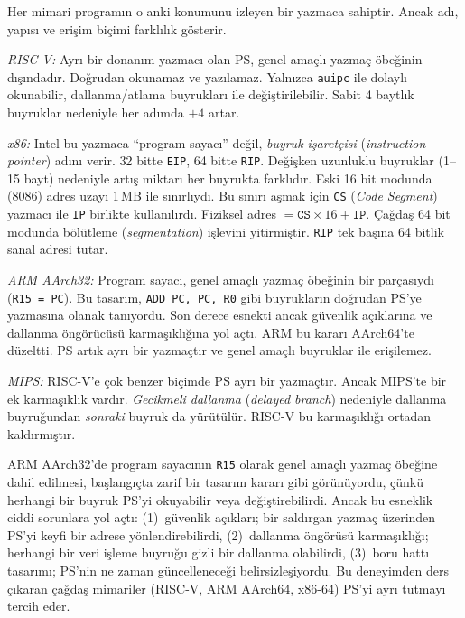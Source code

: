 \begin{karsilastirma}
Her mimari programın o anki konumunu izleyen bir yazmaca sahiptir. Ancak adı, yapısı ve erişim biçimi farklılık gösterir.

\emph{RISC-V:} Ayrı bir donanım yazmacı olan PS, genel amaçlı yazmaç öbeğinin dışındadır. Doğrudan okunamaz ve yazılamaz. Yalnızca \texttt{auipc} ile dolaylı okunabilir, dallanma/atlama buyrukları ile değiştirilebilir. Sabit 4 baytlık buyruklar nedeniyle her adımda $+4$ artar.

\emph{x86:} Intel bu yazmaca ``program sayacı'' değil, \emph{buyruk işaretçisi} (\emph{instruction pointer}) adını verir. 32 bitte \texttt{EIP}, 64 bitte \texttt{RIP}. Değişken uzunluklu buyruklar (1--15 bayt) nedeniyle artış miktarı her buyrukta farklıdır. Eski 16 bit modunda (8086) adres uzayı 1\,MB ile sınırlıydı. Bu sınırı aşmak için \texttt{CS} (\emph{Code Segment}) yazmacı ile \texttt{IP} birlikte kullanılırdı. Fiziksel adres $= \texttt{CS} \times 16 + \texttt{IP}$. Çağdaş 64 bit modunda bölütleme (\emph{segmentation}) işlevini yitirmiştir. \texttt{RIP} tek başına 64 bitlik sanal adresi tutar.

\emph{ARM AArch32:} Program sayacı, genel amaçlı yazmaç öbeğinin bir parçasıydı (\texttt{R15 = PC}). Bu tasarım, \texttt{ADD PC, PC, R0} gibi buyrukların doğrudan PS'ye yazmasına olanak tanıyordu. Son derece esnekti ancak güvenlik açıklarına ve dallanma öngörücüsü karmaşıklığına yol açtı. ARM bu kararı AArch64'te düzeltti. PS artık ayrı bir yazmaçtır ve genel amaçlı buyruklar ile erişilemez.

\emph{MIPS:} RISC-V'e çok benzer biçimde PS ayrı bir yazmaçtır. Ancak MIPS'te bir ek karmaşıklık vardır. \emph{Gecikmeli dallanma} (\emph{delayed branch}) nedeniyle dallanma buyruğundan \emph{sonraki} buyruk da yürütülür. RISC-V bu karmaşıklığı ortadan kaldırmıştır.
\end{karsilastirma}

\begin{bilginot}
ARM AArch32'de program sayacının \texttt{R15} olarak genel amaçlı yazmaç öbeğine dahil edilmesi, başlangıçta zarif bir tasarım kararı gibi görünüyordu, çünkü herhangi bir buyruk PS'yi okuyabilir veya değiştirebilirdi. Ancak bu esneklik ciddi sorunlara yol açtı: (1)~güvenlik açıkları; bir saldırgan yazmaç üzerinden PS'yi keyfi bir adrese yönlendirebilirdi, (2)~dallanma öngörüsü karmaşıklığı; herhangi bir veri işleme buyruğu gizli bir dallanma olabilirdi, (3)~boru hattı tasarımı; PS'nin ne zaman güncelleneceği belirsizleşiyordu. Bu deneyimden ders çıkaran çağdaş mimariler (RISC-V, ARM AArch64, x86-64) PS'yi ayrı tutmayı tercih eder.
\end{bilginot}

